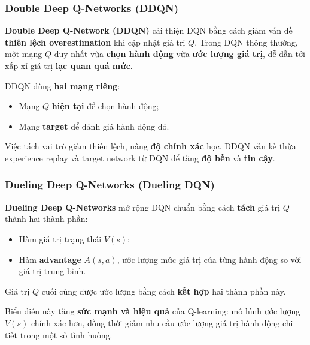 \subsubsection{Double Deep Q-Networks (DDQN)}

\begin{ynghia}[title={Giảm thiên lệch overestimation}]
\textbf{Double Deep Q-Network (DDQN)} cải thiện DQN bằng cách giảm vấn đề \textbf{thiên lệch overestimation} khi cập nhật giá trị $Q$.
Trong DQN thông thường, một mạng $Q$ duy nhất vừa \textbf{chọn hành động} vừa \textbf{ước lượng giá trị}, dễ dẫn tới xấp xỉ giá trị \textbf{lạc quan quá mức}.
\end{ynghia}

\begin{phuongphap}[title={Hai mạng trong DDQN}]
DDQN dùng \textbf{hai mạng riêng}:
\begin{itemize}
  \item Mạng $Q$ \textbf{hiện tại} để chọn hành động;
  \item Mạng \textbf{target} để đánh giá hành động đó.
\end{itemize}
Việc tách vai trò giảm thiên lệch, nâng \textbf{độ chính xác} học.
DDQN vẫn kế thừa experience replay và target network từ DQN để tăng \textbf{độ bền} và \textbf{tin cậy}.
\end{phuongphap}

\subsubsection{Dueling Deep Q-Networks (Dueling DQN)}

\begin{dinhnghia}[title={Dueling DQN}]
\textbf{Dueling Deep Q-Networks} mở rộng DQN chuẩn bằng cách \textbf{tách} giá trị $Q$ thành hai thành phần:
\begin{itemize}
  \item Hàm giá trị trạng thái $V(s)$;
  \item Hàm \textbf{advantage} $A(s,a)$, ước lượng mức giá trị của từng hành động so với giá trị trung bình.
\end{itemize}
Giá trị $Q$ cuối cùng được ước lượng bằng cách \textbf{kết hợp} hai thành phần này.
\end{dinhnghia}

\begin{tinhchat}[title={Lợi ích biểu diễn tách rời}]
Biểu diễn này tăng \textbf{sức mạnh và hiệu quả} của Q-learning: mô hình ước lượng $V(s)$ chính xác hơn, đồng thời giảm nhu cầu ước lượng giá trị hành động chi tiết trong một số tình huống.
\end{tinhchat}

